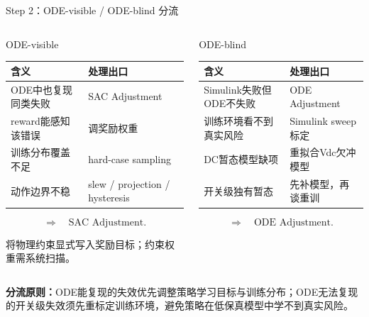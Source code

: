 \documentclass[10pt,aspectratio=169,mathserif]{beamer}
\begin{document}
\begin{frame}{Step 2：ODE-visible / ODE-blind 分流}
\begin{columns}[T,onlytextwidth]
\begin{block}{ODE-visible}
\begin{table}
\centering\scriptsize
\begin{tabular}{ll}
\toprule
含义 & 处理出口 \\
\midrule
ODE中也复现同类失败 & SAC Adjustment \\
reward能感知该错误 & 调奖励权重 \\
训练分布覆盖不足 & hard-case sampling \\
动作边界不稳 & slew / projection / hysteresis \\
\bottomrule
\end{tabular}
\end{table}
\[
\Rightarrow\quad \text{SAC Adjustment}.
\]
\vspace{-0.2cm}

将物理约束显式写入奖励目标；约束权重需系统扫描\cite{haarnoja_sac}。
\end{block}

\begin{block}{ODE-blind}
\begin{table}
\centering\scriptsize
\begin{tabular}{ll}
\toprule
含义 & 处理出口 \\
\midrule
Simulink失败但ODE不失败 & ODE Adjustment \\
训练环境看不到真实风险 & Simulink sweep标定 \\
DC暂态模型缺项 & 重拟合Vdc欠冲模型 \\
开关级独有暂态 & 先补模型，再谈重训 \\
\bottomrule
\end{tabular}
\end{table}
\[
\Rightarrow\quad \text{ODE Adjustment}.
\]
\end{block}
\end{columns}

\medskip
\textbf{分流原则：}ODE能复现的失效优先调整策略学习目标与训练分布；ODE无法复现的开关级失效须先重标定训练环境，避免策略在低保真模型中学不到真实风险。
\end{frame}
\end{document}

